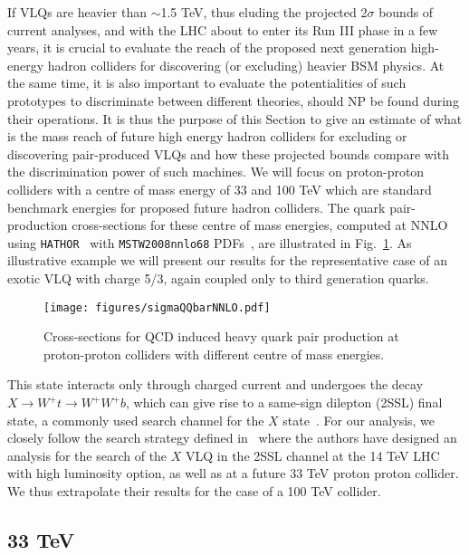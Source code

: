 \documentclass[a4paper]{article}
\begin{document}
If VLQs are heavier than $\sim$1.5 TeV, thus eluding the projected 2$\sigma$ bounds of current analyses, and with the LHC about to enter its Run III phase in a few years, it is crucial to evaluate the reach of the proposed next generation high-energy hadron colliders for discovering (or excluding) heavier BSM physics. At the same time, it is also important to evaluate the potentialities of such prototypes to discriminate between different theories, should NP be found during their operations. It is thus the purpose of this Section to give an estimate of what is the mass reach of future high energy hadron colliders for excluding or discovering pair-produced VLQs and how these projected bounds compare with the discrimination power of such machines. 
We will focus on proton-proton colliders with a centre of mass energy of 33 and 100 TeV which are standard benchmark energies for proposed future hadron colliders. The quark pair-production cross-sections for these centre of mass energies, computed at NNLO using {\tt HATHOR}~\cite{Aliev:2010zk} with {\tt MSTW2008nnlo68} PDFs~\cite{Martin:2009bu}, are illustrated in Fig.~\ref{fig:sigmas}. As illustrative example we will present our results for the representative case of an exotic VLQ with charge 5/3, again coupled only to third generation quarks. 
\begin{figure}[htbp!]
\centering
\texttt{[image: figures/sigmaQQbarNNLO.pdf]}
\caption{\label{fig:sigmas} Cross-sections for QCD induced heavy quark pair production at proton-proton colliders with different centre of mass energies.}
\end{figure}
This state interacts only through charged current and undergoes the decay $X\to W^+ t \to W^+ W^+ b$, which can give rise to a same-sign dilepton (2SSL) final state, a commonly used search channel for the $X$ state~\cite{Chatrchyan:2013wfa,Sirunyan:2017jin}.
For our analysis, we closely follow the search strategy defined in~\cite{Avetisyan:2013rca} where the authors have designed an analysis for the search of the $X$ VLQ in the 2SSL channel at the 14 TeV LHC with high luminosity option, as well as at a future 33 TeV proton proton collider. We thus extrapolate their results for the case of a 100 TeV collider.

\subsection{33 TeV}
\end{document}
